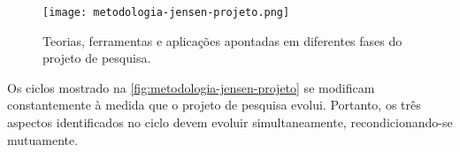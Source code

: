 \begin{apendicesenv}
	\begin{figure}[htb]
		\centering
		\texttt{[image: metodologia-jensen-projeto.png]}
		\caption{Teorias, ferramentas e aplicações apontadas em diferentes fases do projeto de pesquisa.}
		\label{fig:metodologia-jensen-projeto}
	\end{figure}

	Os ciclos mostrado na \autoref{fig:metodologia-jensen-projeto} se modificam constantemente à medida que o projeto de pesquisa evolui. Portanto, os três aspectos identificados no ciclo devem evoluir simultaneamente, recondicionando-se mutuamente.

\end{apendicesenv}